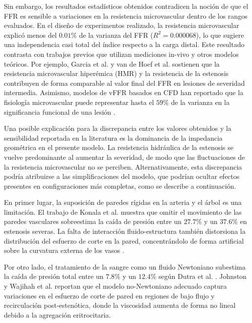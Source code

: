 \documentclass[12pt, letterpaper]{article}
\begin{document}
Sin embargo, los resultados estadísticos obtenidos contradicen la noción de que el FFR es sensible a variaciones en la resistencia microvascular dentro de los rangos evaluados. En el diseño de experimentos realizado, la resistencia microvascular explicó menos del $0.01\%$ de la varianza del FFR ($R^2 = 0.000068$), lo que sugiere una independencia casi total del índice respecto a la carga distal. Este resultado contrasta con trabajos previos que utilizan mediciones in-vivo y otros modelos teóricos. Por ejemplo, Garcia et al. \cite{Garcia2019Relationship} y van de Hoef et al. \cite{VanDeHoef2014Impact} sostienen que la resistencia microvascular hiperémica (HMR) y la resistencia de la estenosis contribuyen de forma comparable al valor final del FFR en lesiones de severidad intermedia. Asimismo, modelos de vFFR basados en CFD han reportado que la fisiología microvascular puede representar hasta el $59\%$ de la varianza en la significancia funcional de una lesión \cite{Soto2017Fast}.

Una posible explicación para la discrepancia entre los valores obtenidos y la sensibilidad reportada en la literatura es la dominancia de la impedancia geométrica en el presente modelo. La resistencia hidráulica de la estenosis se vuelve predominante al aumentar la severidad, de modo que las fluctuaciones de la resistencia microvascular no se perciben. Alternativamente, esta discrepancia podría atribuirse a las simplificaciones del modelo, que podrían ocultar efectos presentes en configuraciones más completas, como se describe a continuación.

En primer lugar, la suposición de paredes rígidas en la arteria y el árbol es una limitación. El trabajo de Konala et al. \cite{Konala2011Influence} muestra que omitir el movimiento de las paredes vasculares sobreestima la caída de presión entre un $27.7\%$ y un $37.6\%$ en estenosis severas. La falta de interacción fluido-estructura también distorsiona la distribución del esfuerzo de corte en la pared, concentrándolo de forma artificial sobre la curvatura externa de los vasos \cite{Failer2021Impact, Kandangwa2022Influence}.

Por otro lado, el tratamiento de la sangre como un fluido Newtoniano subestima la caída de presión total entre un $7.8\%$ y un $12.4\%$ según Dutra et al. \cite{Dutra2021Effect}. Johnston \cite{Johnston2006Modelling} y Wajihah et al. \cite{Wajihah2023Review} reportan que el modelo no-Newtoniano adecuado captura variaciones en el esfuerzo de corte de pared en regiones de bajo flujo y recirculación post-estenótica, donde la viscosidad aumenta de forma no lineal debido a la agregación eritrocitaria.
\end{document}
